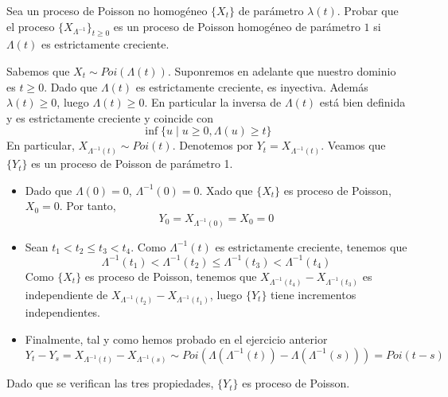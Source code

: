 \documentclass[twoside]{article}
\begin{document}
\begin{ejercicio}{12}
Sea un proceso de Poisson no homogéneo $\{X_{t} \}$ de parámetro $\lambda(t)$. Probar que el proceso $\{X_{\Lambda^{-1}}\}_{ t \geq 0}$  es un proceso de Poisson homogéneo de parámetro $1$ si $\Lambda(t)$ es estrictamente creciente.
\end{ejercicio}
\begin{solucion}
Sabemos que $X_t \sim Poi(\Lambda(t))$. Suponremos en adelante que nuestro dominio es $t\geq 0$. Dado que $\Lambda(t)$ es estrictamente creciente, es inyectiva. Además $\lambda(t)\geq 0$, luego $\Lambda(t)\geq 0$. En particular la inversa de $\Lambda(t)$ está bien definida y es estrictamente creciente y coincide con
$$
\inf \{u \mid u \geq 0 , \Lambda(u)\geq t\}
$$ 
En particular, $X_{\Lambda^{-1}(t)} \sim Poi(t)$. Denotemos por $Y_t = X_{\Lambda^{-1}(t)}$. Veamos que $\{Y_t\}$ es un proceso de Poisson de parámetro 1. 
\begin{itemize}
\item Dado que $\Lambda(0)=0$, $\Lambda^{-1}(0)=0$. Xado que $\{X_t\}$ es proceso de Poisson, $X_0=0$. Por tanto,
$$
Y_0 = X_{\Lambda^{-1}(0)}= X_0 = 0
$$
\item Sean $t_1 < t_2 \leq t_3 < t_4$. Como $\Lambda^{-1}(t)$ es estrictamente creciente, tenemos que 
$$
\Lambda^{-1}(t_1)<\Lambda^{-1}(t_2)\leq \Lambda^{-1}(t_3) < \Lambda^{-1}(t_4)
$$
Como $\{X_t\}$ es proceso de Poisson, tenemos que $X_{\Lambda^{-1}(t_4)}- X_{\Lambda^{-1}(t_3)}$ es independiente de $X_{\Lambda^{-1}(t_2)}- X_{\Lambda^{-1}(t_1)}$, luego $\{Y_t\}$ tiene incrementos independientes.
\item Finalmente, tal y como hemos probado en el ejercicio anterior
$$
Y_t - Y_s = X_{\Lambda^{-1}(t)}-X_{\Lambda^{-1}(s)} \sim Poi(\Lambda(\Lambda^{-1}(t))-\Lambda(\Lambda^{-1}(s))) = Poi(t-s)
$$
\end{itemize} 
Dado que se verifican las tres propiedades, $\{Y_t\}$ es proceso de Poisson.


\end{solucion}
\end{document}
